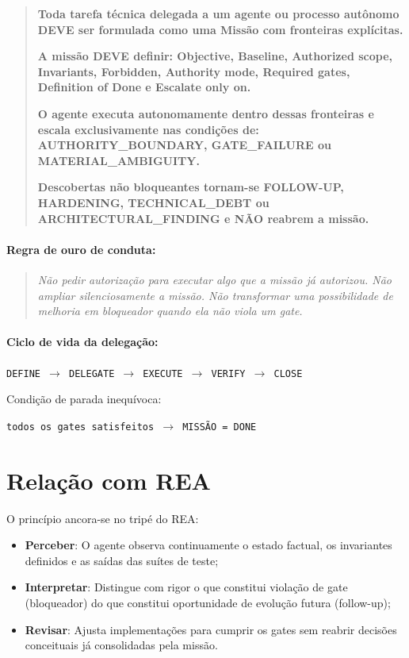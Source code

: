 \begin{quote}
\textbf{Toda tarefa técnica delegada a um agente ou processo autônomo DEVE ser
formulada como uma Missão com fronteiras explícitas.}

\medskip

\textbf{A missão DEVE definir: Objective, Baseline, Authorized scope,
Invariants, Forbidden, Authority mode, Required gates, Definition of Done e
Escalate only on.}

\medskip

\textbf{O agente executa autonomamente dentro dessas fronteiras e escala
exclusivamente nas condições de: AUTHORITY\_BOUNDARY, GATE\_FAILURE ou
MATERIAL\_AMBIGUITY.}

\medskip

\textbf{Descobertas não bloqueantes tornam-se FOLLOW-UP, HARDENING,
TECHNICAL\_DEBT ou ARCHITECTURAL\_FINDING e NÃO reabrem a missão.}
\end{quote}

\paragraph{Regra de ouro de conduta:}
\begin{quote}
\textit{Não pedir autorização para executar algo que a missão já autorizou.
Não ampliar silenciosamente a missão.
Não transformar uma possibilidade de melhoria em bloqueador quando ela não viola um gate.}
\end{quote}

\paragraph{Ciclo de vida da delegação:}
\begin{center}
\texttt{DEFINE $\rightarrow$ DELEGATE $\rightarrow$ EXECUTE $\rightarrow$ VERIFY $\rightarrow$ CLOSE}
\end{center}

Condição de parada inequívoca:
\begin{center}
\texttt{todos os gates satisfeitos $\rightarrow$ MISSÃO = DONE}
\end{center}

\section{Relação com REA}

O princípio ancora-se no tripé do REA:
\begin{itemize}
  \item \textbf{Perceber}: O agente observa continuamente o estado factual, os
    invariantes definidos e as saídas das suítes de teste;
  \item \textbf{Interpretar}: Distingue com rigor o que constitui violação de
    gate (bloqueador) do que constitui oportunidade de evolução futura (follow-up);
  \item \textbf{Revisar}: Ajusta implementações para cumprir os gates sem
    reabrir decisões conceituais já consolidadas pela missão.
\end{itemize}

